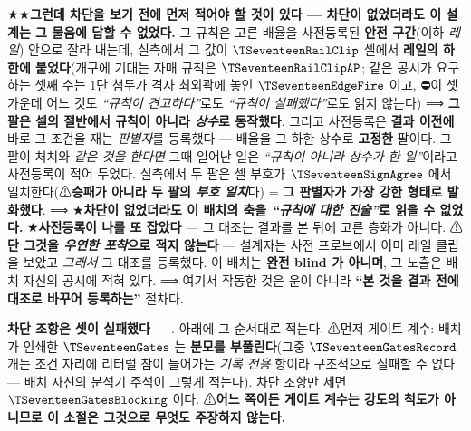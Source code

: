 \documentclass[11pt]{report}
\numberwithin{equation}{chapter}
\numberwithin{figure}{chapter}
\numberwithin{table}{chapter}
\begin{document}
★★\textbf{그런데 차단을 보기 전에 먼저 적어야 할 것이 있다 --- 차단이 없었더라도 이 설계는
그 물음에 답할 수 없었다.} 그 규칙은 고른 배율을 사전등록된 \textbf{안전 구간}(이하
\emph{레일}) 안으로 잘라 내는데, 실측에서 그 값이 $\TSeventeenRailClip$ 셀에서
\textbf{레일의 하한에 붙었다}(개구에 기대는 자매 규칙은 $\TSeventeenRailClipAP$;
같은 공시가 요구하는 셋째 수는 $1$단 첨두가 격자 최외곽에 놓인 $\TSeventeenEdgeFire$ 이고,
⛔이 셋 가운데 어느 것도 \emph{``규칙이 견고하다''}로도 \emph{``규칙이 실패했다''}로도
읽지 않는다) ⟹
\textbf{그 팔은 셀의 절반에서 규칙이 아니라 \emph{상수}로 동작했다}. 그리고 사전등록은
\textbf{결과 이전에} 바로 그 조건을 재는 \emph{판별자}를 등록했다 --- 배율을 그 하한
상수로 \textbf{고정한} 팔이다. 그 팔이 처치와 \emph{같은 것을 한다면} 그때 일어난 일은
\emph{``규칙이 아니라 상수가 한 일''}이라고 사전등록이 적어 두었다. 실측에서 두 팔은 셀
부호가 $\TSeventeenSignAgree$ 에서 일치한다(⚠\textbf{승패가 아니라 두 팔의 \emph{부호
일치}}다) = \textbf{그 판별자가 가장 강한 형태로 발화했다}. ⟹ ★\textbf{차단이
없었더라도 이 배치의 축을 \emph{``규칙에 대한 진술''}로 읽을 수 없었다.}
★\textbf{사전등록이 나를 또 잡았다} --- 그 대조는 결과를 본 뒤에 고른 층화가 아니다.
⚠\textbf{단 그것을 \emph{우연한 포착}으로 적지 않는다} --- 설계자는 사전 프로브에서 이미
레일 클립을 보았고 \emph{그래서} 그 대조를 등록했다. 이 배치는 \textbf{완전 blind 가
아니며}, 그 노출은 배치 자신의 공시에 적혀 있다. ⟹ 여기서 작동한 것은 운이 아니라
\textbf{``본 것을 결과 전에 대조로 바꾸어 등록하는''} 절차다.

\textbf{차단 조항은 셋이 실패했다} --- \TSeventeenBlockers{}. 아래에 그 순서대로 적는다.
⚠먼저 게이트 계수: 배치가 인쇄한 $\TSeventeenGates$ 는 \textbf{분모를 부풀린다}(그중
$\TSeventeenGatesRecord$ 개는 조건 자리에 리터럴 참이 들어가는 \emph{기록 전용} 항이라
구조적으로 실패할 수 없다 --- 배치 자신의 분석기 주석이 그렇게 적는다). 차단 조항만 세면
$\TSeventeenGatesBlocking$ 이다. ⚠\textbf{어느 쪽이든 게이트 계수는 강도의 척도가 아니므로
이 소절은 그것으로 무엇도 주장하지 않는다.}
\end{document}
